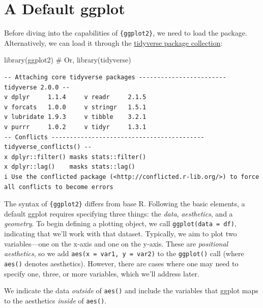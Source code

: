 \documentclass[
  letterpaper,
]{scrbook}
\newenvironment{Shaded}{\begin{snugshade}}{\end{snugshade}}
\newcommand{\CommentTok}[1]{\textcolor[rgb]{0.37,0.37,0.37}{#1}}
\newcommand{\FunctionTok}[1]{\textcolor[rgb]{0.28,0.35,0.67}{#1}}
\newcommand{\NormalTok}[1]{\textcolor[rgb]{0.00,0.23,0.31}{#1}}
\begin{document}
\section{A Default ggplot}\label{default}

Before diving into the capabilities of \texttt{\{ggplot2\}}, we need to
load the package. Alternatively, we can load it through the
\href{https://www.tidyverse.org/}{tidyverse package collection}:

\begin{Shaded}
\begin{Highlighting}[]
\FunctionTok{library}\NormalTok{(ggplot2)}
\CommentTok{\# Or,}
\FunctionTok{library}\NormalTok{(tidyverse)}
\end{Highlighting}
\end{Shaded}

\begin{verbatim}
-- Attaching core tidyverse packages ------------------------ tidyverse 2.0.0 --
v dplyr     1.1.4     v readr     2.1.5
v forcats   1.0.0     v stringr   1.5.1
v lubridate 1.9.3     v tibble    3.2.1
v purrr     1.0.2     v tidyr     1.3.1
-- Conflicts ------------------------------------------ tidyverse_conflicts() --
x dplyr::filter() masks stats::filter()
x dplyr::lag()    masks stats::lag()
i Use the conflicted package (<http://conflicted.r-lib.org/>) to force all conflicts to become errors
\end{verbatim}

The syntax of \texttt{\{ggplot2\}} differs from base R. Following the
basic elements, a default ggplot requires specifying three things: the
\emph{data}, \emph{aesthetics}, and a \emph{geometry}. To begin defining
a plotting object, we call \texttt{ggplot(data\ =\ df)}, indicating that
we'll work with that dataset. Typically, we aim to plot two
variables---one on the x-axis and one on the y-axis. These are
\emph{positional aesthetics}, so we add
\texttt{aes(x\ =\ var1,\ y\ =\ var2)} to the \texttt{ggplot()} call
(where \texttt{aes()} denotes aesthetics). However, there are cases
where one may need to specify one, three, or more variables, which we'll
address later.

\begin{tcolorbox}[enhanced jigsaw, toprule=.15mm, bottomtitle=1mm, coltitle=black, breakable, colbacktitle=quarto-callout-important-color!10!white, opacityback=0, toptitle=1mm, colframe=quarto-callout-important-color-frame, titlerule=0mm, title=\textcolor{quarto-callout-important-color}{\faExclamation}\hspace{0.5em}{Pay Attention!}, bottomrule=.15mm, arc=.35mm, opacitybacktitle=0.6, leftrule=.75mm, left=2mm, rightrule=.15mm, colback=white]

We indicate the data \emph{outside} of \texttt{aes()} and include the
variables that ggplot maps to the aesthetics \emph{inside} of
\texttt{aes()}.

\end{tcolorbox}
\end{document}
